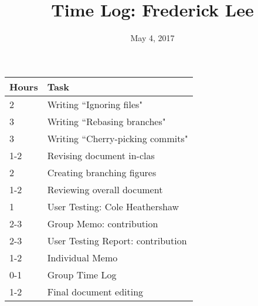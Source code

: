 \documentclass{article}
\title{Time Log: Frederick Lee}
\date{May 4, 2017}
\begin{document}
\maketitle

\begin{table}[h]
\centering
\label{my-label}
\begin{tabular}{ll}
\textbf{Hours} & \textbf{Task}            \\ \hline
2     & Writing ``Ignoring files"         \\
3     & Writing ``Rebasing branches"      \\
3     & Writing ``Cherry-picking commits" \\
1-2   & Revising document in-clas         \\
2     & Creating branching figures        \\
1-2   & Reviewing overall document        \\
1     & User Testing: Cole Heathershaw    \\
2-3   & Group Memo: contribution          \\
2-3   & User Testing Report: contribution \\
1-2   & Individual Memo                   \\
0-1   & Group Time Log                    \\
1-2   & Final document editing            \\
\end{tabular}
\end{table}
\end{document}

